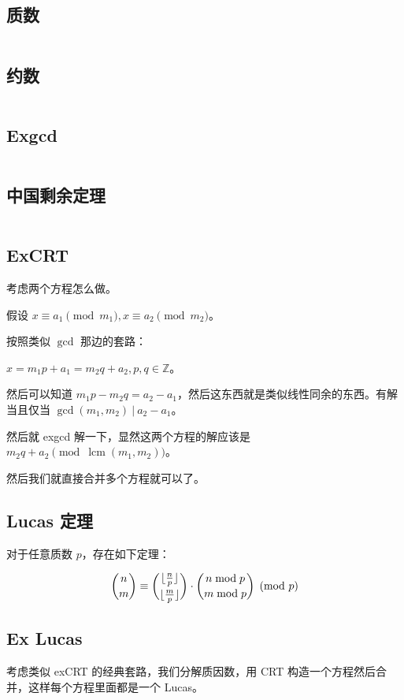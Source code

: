 \documentclass[titlepage, a4paper]{article}
\begin{document}
\begin{multicols}{2}
\begin{spacing}{0.6}
			 	\subsection{质数}
			 		\inputminted{cpp}{src/Math/Primes.cpp}
			 	\subsection{约数}
			 		\inputminted{cpp}{src/Math/Factors.cpp}
			 	\subsection{Exgcd}
			 		\inputminted{cpp}{src/Math/Ex_gcd.cpp}
			 	\subsection{中国剩余定理}
			 		\inputminted{cpp}{src/Math/Crt.cpp}
			 		
			 	\subsection{ExCRT}
			 		考虑两个方程怎么做。
			 		
			 		假设 $x \equiv a_1 \pmod{m_1}, x \equiv a_2 \pmod{m_2}$。
			 		
			 		按照类似 $\gcd$ 那边的套路：
			 		
			 		$x = m_1p + a_1 = m_2q + a_2, p, q \in \mathbb{Z}$。
			 		
			 		然后可以知道 $m_1p - m_2q = a_2 - a_1$，然后这东西就是类似线性同余的东西。有解当且仅当 $\gcd(m_1, m_2)\ |\ a_2 - a_1$。
			 		
			 		然后就 exgcd 解一下，显然这两个方程的解应该是 $m_2q + a_2 \pmod{\operatorname{lcm}(m_1, m_2)}$。
			 		
			 		然后我们就直接合并多个方程就可以了。
			 	\subsection{Lucas 定理}
			 		对于任意质数 $p$，存在如下定理：
			 		
			 		$$
			 		\dbinom{n}{m} \equiv \dbinom{\lfloor\frac{n}{p}\rfloor}{\lfloor\frac{m}{p}\rfloor} \cdot \dbinom{n \bmod p}{m \bmod p} \pmod p
			 		$$
			 		
			 	\subsection{Ex Lucas}
			 		
			 		考虑类似 exCRT 的经典套路，我们分解质因数，用 CRT 构造一个方程然后合并，这样每个方程里面都是一个 Lucas。
			 		

\end{spacing}
\end{multicols}
\end{document}
